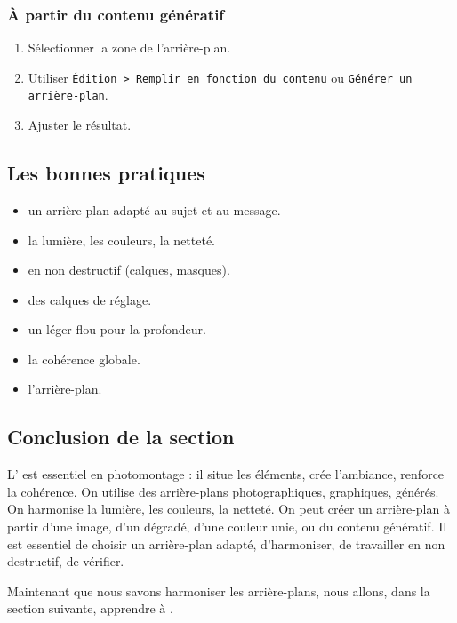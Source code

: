\subsubsection{À partir du contenu génératif}

\begin{enumerate}
    \item Sélectionner la zone de l'arrière-plan.
    \item Utiliser \texttt{Édition > Remplir en fonction du contenu} ou \texttt{Générer un arrière-plan}.
    \item Ajuster le résultat.
\end{enumerate}

\subsection{Les bonnes pratiques}

\begin{itemize}
    \item {} un arrière-plan adapté au sujet et au message.
    \item {} la lumière, les couleurs, la netteté.
    \item {} en non destructif (calques, masques).
    \item {} des calques de réglage.
    \item {} un léger flou pour la profondeur.
    \item {} la cohérence globale.
    \item {} l'arrière-plan.
\end{itemize}

\subsection*{Conclusion de la section}

L' est essentiel en photomontage : il situe les éléments, crée l'ambiance, renforce la cohérence. On utilise des arrière-plans photographiques, graphiques, générés. On harmonise la lumière, les couleurs, la netteté. On peut créer un arrière-plan à partir d'une image, d'un dégradé, d'une couleur unie, ou du contenu génératif. Il est essentiel de choisir un arrière-plan adapté, d'harmoniser, de travailler en non destructif, de vérifier.

Maintenant que nous savons harmoniser les arrière-plans, nous allons, dans la section suivante, apprendre à .

